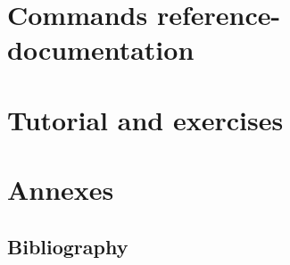 \part{Commands reference-documentation}






\part{Tutorial and exercises}




\part{Annexes}

\appendix

\chapter{Bibliography}


